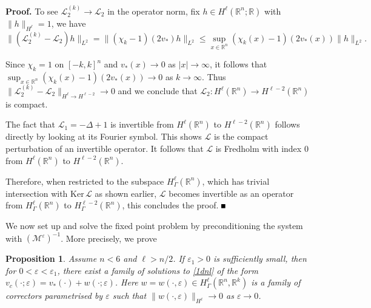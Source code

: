 \documentclass[10pt]{article}
\newtheorem{Proposition}[Lemma]{Proposition}
\newenvironment{Proof}%
 {\begin{trivlist} \item[]{\bf Proof. }}%
 {\hspace*{\fill}$\rule{.4\baselineskip}{.4\baselineskip}$\end{trivlist}}
\newcommand{\R}{\mathbb{R}}
\renewcommand{\ker}{\mathrm{Ker}\,}
\newcommand{\eps}{\varepsilon}
\newcommand{\cL}{\mathcal{L}}
\newcommand{\M}{\mathcal{M}}
\begin{document}
\begin{Proof}
To see $\cL_2^{(k)} \to \cL_2$ in the operator norm, fix $h \in H^\ell(\R^n;\R)$ with $\|h\|_{H^\ell} =1$, we have
\[
\|(\cL_2^{(k)}-\cL_2)h\|_{L^2} = \|(\chi_k-1)(2v_*)h\|_{L^2}\le  \sup_{x\in \R^n}(\chi_k(x)-1)(2v_*(x)) \|h\|_{L^2}.
\]

Since $\chi_k = 1$ on $[-k,k]^n$ and $v_*(x) \to 0$ as $|x|\to \infty$, it follows that $\displaystyle \sup_{x\in \R^n}(\chi_k(x)-1)(2v_*(x)) \to 0$ as $k \to \infty$. Thus $\|\cL_2^{(k)} - \cL_2\|_{H^\ell \to H^{\ell-2}} \to 0$ and we conclude that $\cL_2:H^\ell(\R^n) \to H^{\ell-2}(\R^n)$ is compact.

The fact that $\cL_1  = -\Delta  +1 $ is invertible from $H^\ell (\R^n)$ to $H^{\ell-2}(\R^n)$ follows directly by looking at its Fourier symbol. This shows $\cL$ is the compact perturbation of an invertible operator. It follows that $\cL$ is Fredholm with index $0$ from $H^\ell(\R^n)$ to $H^{\ell-2}(\R^n)$.

Therefore, when restricted to the subspace $H^\ell_{\Gamma}(\R^n)$, which has trivial intersection with $\ker \cL$ as shown earlier, $\cL$ becomes invertible as an operator from $H^\ell_\Gamma(\R^n)$ to $H^{\ell-2}_\Gamma(\R^n)$, this concludes the proof.
\end{Proof}


We now set up and solve the fixed point problem by preconditioning the system with $(\M^\eps)^{-1}$. More precisely, we prove
\begin{Proposition}\label{prop} Assume $n<6$ and $\ell>n/2$. If $\eps_1>0$ is sufficiently small, then for $0<\eps <\eps_1$, there exist a family of solutions to \eqref{1dnl} of the form $v_c(\cdot;\eps) = v_*(\cdot)+w(\cdot; \eps)$. Here $w=w(\cdot,\eps) \in H^{\ell}_{\Gamma}(\R^n,\R^k)$ is a family of correctors parametrised by $\eps $ such that $\|w(\cdot,\eps)\|_{H^\ell} \to 0$ as $\eps \to 0$.
\end{Proposition}

\end{document}
